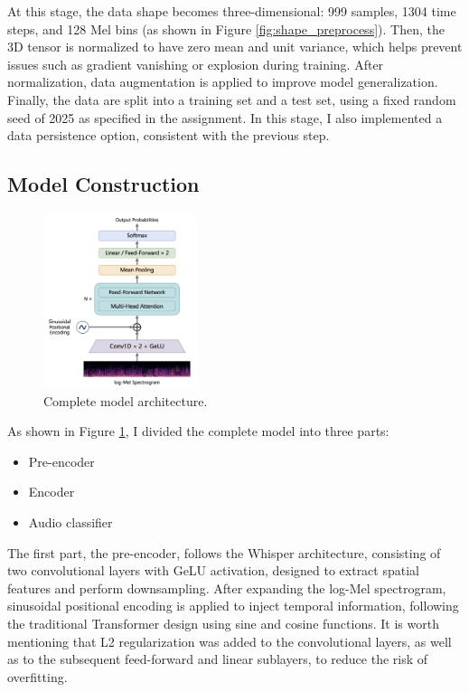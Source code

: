 \documentclass{article}
\begin{document}
      At this stage, the data shape becomes three-dimensional: 999 samples, 1304 time steps, and 128 Mel bins (as shown in Figure \ref{fig:shape_preprocess}). Then, the 3D tensor is normalized to have zero mean and unit variance, which helps prevent issues such as gradient vanishing or explosion during training. After normalization, data augmentation is applied to improve model generalization. Finally, the data are split into a training set and a test set, using a fixed random seed of 2025 as specified in the assignment. In this stage, I also implemented a data persistence option, consistent with the previous step.

    \subsection{Model Construction}

      \begin{figure}[H]
        \centering
        \includegraphics[width=0.4\textwidth]{figs/architecture.png}
        \caption{Complete model architecture.}
        \label{fig:model_architecture}
      \end{figure}

      As shown in Figure \ref{fig:model_architecture}, I divided the complete model into three parts:

      \begin{itemize}
        \item Pre-encoder
        \item Encoder
        \item Audio classifier
      \end{itemize}

      The first part, the pre-encoder, follows the Whisper architecture, consisting of two convolutional layers with GeLU activation, designed to extract spatial features and perform downsampling. After expanding the log-Mel spectrogram, sinusoidal positional encoding is applied to inject temporal information, following the traditional Transformer design using sine and cosine functions. It is worth mentioning that L2 regularization was added to the convolutional layers, as well as to the subsequent feed-forward and linear sublayers, to reduce the risk of overfitting.
\end{document}
